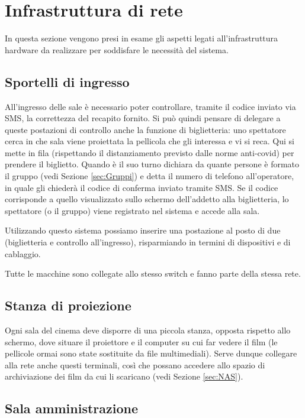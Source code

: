 \documentclass{article}
\begin{document}
\section{Infrastruttura di rete}\label{sec:Infrastruttura}

In questa sezione vengono presi in esame gli aspetti legati all'infrastruttura hardware da realizzare per soddisfare le necessità del sistema.

\subsection{Sportelli di ingresso}\label{sec:Sportelli}

All'ingresso delle sale è necessario poter controllare, tramite il codice inviato via SMS, la correttezza del recapito fornito. Si può quindi pensare di delegare a queste postazioni di controllo anche la funzione di biglietteria: uno spettatore cerca in che sala viene proiettata la pellicola che gli interessa e vi si reca. Qui si mette in fila (rispettando il distanziamento previsto dalle norme anti-covid) per prendere il biglietto. Quando è il suo turno dichiara da quante persone è formato il gruppo (vedi Sezione \ref{sec:Gruppi}) e detta il numero di telefono all'operatore, in quale gli chiederà il codice di conferma inviato tramite SMS. Se il codice corrisponde a quello visualizzato sullo schermo dell'addetto alla biglietteria, lo spettatore (o il gruppo) viene registrato nel sistema e accede alla sala.

Utilizzando questo sistema possiamo inserire una postazione al posto di due (biglietteria e controllo all'ingresso), risparmiando in termini di dispositivi e di cablaggio.

Tutte le macchine sono collegate allo stesso switch e fanno parte della stessa rete.

\subsection{Stanza di proiezione}\label{sec:Proiettori}

Ogni sala del cinema deve disporre di una piccola stanza, opposta rispetto allo schermo, dove situare il proiettore e il computer su cui far vedere il film (le pellicole ormai sono state sostituite da file multimediali). Serve dunque collegare alla rete anche questi terminali, così che possano accedere allo spazio di archiviazione dei film da cui li scaricano (vedi Sezione \ref{sec:NAS}).

\subsection{Sala amministrazione}\label{sec:Amministrazione}
\end{document}
